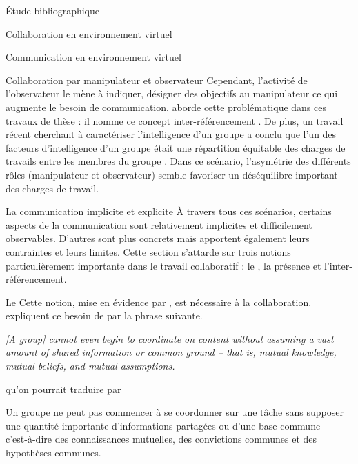 \documentclass[myfrancais,ngerman,english,frenchb]{mythesis}
\begin{document}
\begin{mychapter}{Étude bibliographique}
\begin{mysection}{Collaboration en environnement virtuel}
\begin{mysubsection}{Communication en environnement virtuel}
\begin{mysubsubsection}{Collaboration par manipulateur et observateur}
					Cependant, l'activité de l'observateur le mène à indiquer, désigner des objectifs au manipulateur ce qui augmente le besoin de communication.
					 aborde cette problématique dans ces travaux de thèse : il nomme ce concept inter-référencement .
					De plus, un travail récent cherchant à caractériser \og l'intelligence d'un groupe \fg a conclu que l'un des facteurs d'intelligence d'un groupe était une répartition équitable des charges de travails entre les membres du groupe .
					Dans ce scénario, l'asymétrie des différents rôles (manipulateur et observateur) semble favoriser un déséquilibre important des charges de travail.
				\end{mysubsubsection}
			\end{mysubsection}
			\begin{mysubsection}{La communication implicite et explicite}
				À travers tous ces scénarios, certains aspects de la communication sont relativement implicites et difficilement observables.
				D'autres sont plus concrets mais apportent également leurs contraintes et leurs limites.
				Cette section s'attarde sur trois notions particulièrement importante dans le travail collaboratif : le , la présence et l'inter-référencement.
				\begin{mysubsubsection}{Le }
					Cette notion, mise en évidence par , est nécessaire à la collaboration.
					 expliquent ce besoin de  par la phrase suivante.
					\begin{myquote}[english]
						\it [A group] cannot even begin to coordinate on content without assuming a vast amount of shared information or common ground -- that is, mutual knowledge, mutual beliefs, and mutual assumptions.
					\end{myquote}
					qu'on pourrait traduire par
					\begin{myquote}[frenchb]
						Un groupe ne peut pas commencer à se coordonner sur une tâche sans supposer une quantité importante d'informations partagées ou d'une base commune -- c'est-à-dire des connaissances mutuelles, des convictions communes et des hypothèses communes.
					\end{myquote}


\end{mysubsubsection}
\end{mysubsection}
\end{mysection}
\end{mychapter}
\end{document}
